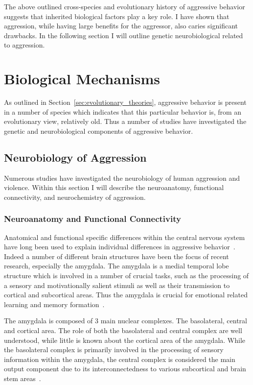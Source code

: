 The above outlined cross-species and evolutionary history of aggressive behavior suggests that inherited biological factors play a key role.
I have shown that aggression, while having large benefits for the aggressor, also caries significant drawbacks.
In the following section I will outline genetic neurobiological related to aggression.

\section{Biological Mechanisms}
\label{sec:biological_mechanisms}

As outlined in Section~\ref{sec:evolutionary_theories}, aggressive behavior is present in a number of species which indicates that this particular behavior is, from an evolutionary view, relatively old.
Thus a number of studies have investigated the genetic and neurobiological components of aggressive behavior.

\subsection{Neurobiology of Aggression}
\label{sub:neurobiology_of_aggression}

Numerous studies have investigated the neurobiology of human aggression and violence.
Within this section I will describe the neuroanatomy, functional connectivity, and neurochemistry of aggression. 

\subsubsection{Neuroanatomy and Functional Connectivity}
\label{ssub:neuroanatomy_and_functional_conectivity}

Anatomical and functional specific differences within the central nervous system have long been used to explain individual differences in aggressive behavior~\citet{Rosell2015}.
Indeed a number of different brain structures have been the focus of recent research, especially the amygdala.
The amygdala is a medial temporal lobe structure which is involved in a number of crucial tasks, such as the processing of a sensory and motivationally salient stimuli as well as their transmission to cortical and subcortical areas.
Thus the amygdala is crucial for emotional related learning and memory formation~\cite{Salzman2010}.

The amygdala is composed of 3 main nuclear complexes.
The basolateral, central and cortical area.
The role of both the basolateral and central complex are well understood, while little is known about the cortical area of the amygdala.
While the basolateral complex is primarily involved in the processing of sensory information within the amygdala, the central complex is considered the main output component due to its interconnectedness to various subcortical and brain stem areas~\cite{Sah2003}.

